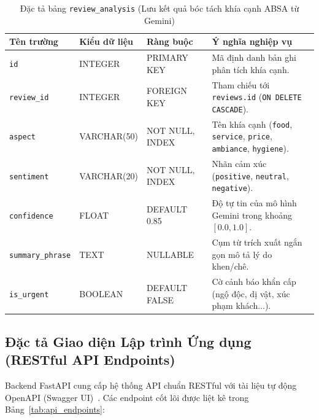\documentclass[12pt, a4paper]{article}
\begin{document}
\begin{table}[H]
\centering
\caption{Đặc tả bảng \texttt{review\_analysis} (Lưu kết quả bóc tách khía cạnh ABSA từ Gemini)}
\label{tab:schema_analysis}
\vspace{0.15cm}
\footnotesize
\begin{tabularx}{\textwidth}{l l l X}
\toprule
\rowcolor{blue!8}
\textbf{Tên trường} & \textbf{Kiểu dữ liệu} & \textbf{Ràng buộc} & \textbf{Ý nghĩa nghiệp vụ} \\
\midrule
\texttt{id} & INTEGER & PRIMARY KEY & Mã định danh bản ghi phân tích khía cạnh. \\
\texttt{review\_id} & INTEGER & FOREIGN KEY & Tham chiếu tới \texttt{reviews.id} (\texttt{ON DELETE CASCADE}). \\
\texttt{aspect} & VARCHAR(50) & NOT NULL, INDEX & Tên khía cạnh (\texttt{food}, \texttt{service}, \texttt{price}, \texttt{ambiance}, \texttt{hygiene}). \\
\texttt{sentiment} & VARCHAR(20) & NOT NULL, INDEX & Nhãn cảm xúc (\texttt{positive}, \texttt{neutral}, \texttt{negative}). \\
\texttt{confidence} & FLOAT & DEFAULT 0.85 & Độ tự tin của mô hình Gemini trong khoảng $[0.0, 1.0]$. \\
\texttt{summary\_phrase} & TEXT & NULLABLE & Cụm từ trích xuất ngắn gọn mô tả lý do khen/chê. \\
\texttt{is\_urgent} & BOOLEAN & DEFAULT FALSE & Cờ cảnh báo khẩn cấp (ngộ độc, dị vật, xúc phạm khách...). \\
\bottomrule
\end{tabularx}
\end{table}

\subsection{Đặc tả Giao diện Lập trình Ứng dụng (RESTful API Endpoints)}
Backend FastAPI cung cấp hệ thống API chuẩn RESTful với tài liệu tự động OpenAPI (Swagger UI)~\cite{ramirez2025}. Các endpoint cốt lõi được liệt kê trong Bảng~\ref{tab:api_endpoints}:
\end{document}

